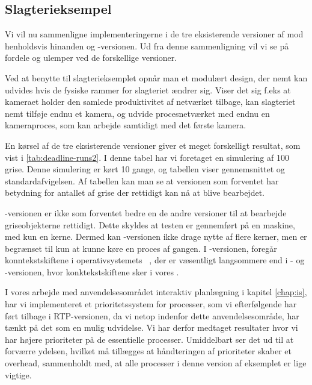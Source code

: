 \subsection{Slagterieksempel}
Vi vil nu sammenligne implementeringerne i de tre eksisterende versioner af \pycsp mod henholdsvis hinanden og -versionen. Ud fra denne sammenligning vil vi se på fordele og ulemper ved de forskellige versioner.

Ved at benytte \pycsp til slagterieksemplet opnår man et modulært design, der nemt kan udvides hvis de fysiske rammer for slagteriet ændrer sig. Viser det sig f.eks at kameraet holder den samlede produktivitet af netværket tilbage, kan slagteriet nemt tilføje endnu et kamera, og udvide procesnetværket med endnu en kameraproces, som kan arbejde samtidigt med det første kamera. 

En kørsel af de tre eksisterende versioner giver et meget forskelligt resultat, som vist i \cref{tab:deadline-runs2}. I denne tabel har vi foretaget en simulering af 100 grise. Denne simulering er kørt 10 gange, og tabellen viser gennemsnittet og standardafvigelsen. Af tabellen kan man se at versionen som forventet har betydning for antallet af grise der rettidigt kan nå at blive bearbejdet. 

-versionen er ikke som forventet bedre en de andre versioner til at bearbejde griseobjekterne rettidigt. Dette skyldes at testen er gennemført på en maskine, med kun en kerne.  Dermed kan -versionen ikke drage nytte  af flere kerner, men er begrænset til kun at kunne køre en proces af gangen. I -versionen, foregår konntekstskiftene i operativsystemets \sched~, der er væsentligt langsommere end i - og -versionen, hvor konktekstskiftene sker i vores \sched. 

I vores arbejde med anvendelsesområdet interaktiv planlægning i kapitel \ref{chap:is}, har vi implementeret et prioritetssystem for processer, som vi efterfølgende har ført tilbage i RTP-versionen, da vi netop indenfor dette anvendelsesområde, har tænkt på det som en mulig udvidelse. Vi har derfor medtaget resultater hvor vi har højere prioriteter på de essentielle processer. Umiddelbart ser det ud til at forværre ydelsen, hvilket må tillægges at håndteringen af prioriteter skaber et overhead, sammenholdt med, at alle processer i denne version af eksemplet er lige vigtige. 


